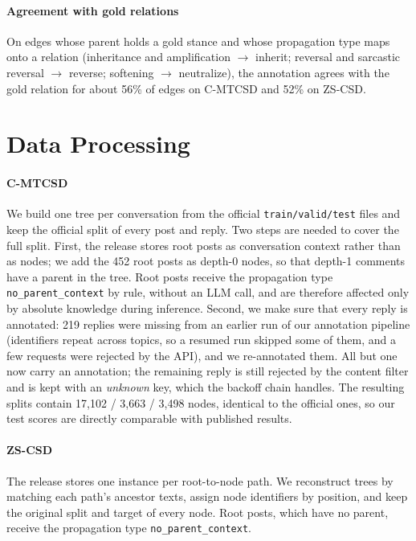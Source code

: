 \paragraph{Agreement with gold relations}
On edges whose parent holds a gold stance and whose propagation type maps onto a relation (inheritance and amplification $\rightarrow$ inherit; reversal and sarcastic reversal $\rightarrow$ reverse; softening $\rightarrow$ neutralize), the annotation agrees with the gold relation for about 56\% of edges on C-MTCSD and 52\% on ZS-CSD.

\section{Data Processing}
\label{app:data}

\paragraph{C-MTCSD}
We build one tree per conversation from the official \texttt{train/valid/test} files and keep the official split of every post and reply. Two steps are needed to cover the full split. First, the release stores root posts as conversation context rather than as nodes; we add the 452 root posts as depth-0 nodes, so that depth-1 comments have a parent in the tree. Root posts receive the propagation type \texttt{no\_parent\_context} by rule, without an LLM call, and are therefore affected only by absolute knowledge during inference. Second, we make sure that every reply is annotated: 219 replies were missing from an earlier run of our annotation pipeline (identifiers repeat across topics, so a resumed run skipped some of them, and a few requests were rejected by the API), and we re-annotated them. All but one now carry an annotation; the remaining reply is still rejected by the content filter and is kept with an \emph{unknown} key, which the backoff chain handles. The resulting splits contain 17,102 / 3,663 / 3,498 nodes, identical to the official ones, so our test scores are directly comparable with published results.

\paragraph{ZS-CSD}
The release stores one instance per root-to-node path. We reconstruct trees by matching each path's ancestor texts, assign node identifiers by position, and keep the original split and target of every node. Root posts, which have no parent, receive the propagation type \texttt{no\_parent\_context}.

